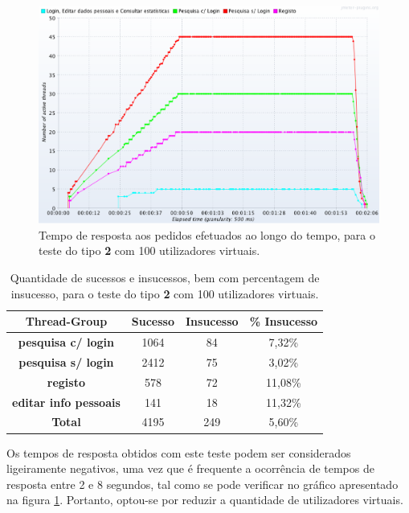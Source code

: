 \begin{figure}[H]
    \centering
    \includegraphics[width=1\textwidth]{images/Testes/4PC_RU100T.png}
    \caption{Tempo de resposta aos pedidos efetuados ao longo do tempo, para o teste do tipo \textbf{2} com 100 utilizadores virtuais.}
    \label{fig:4PC_RU_100_response}
\end{figure}

\begin{table}[H]
\centering
\caption{Quantidade de sucessos e insucessos, bem com percentagem de insucesso, para o teste do tipo \textbf{2} com 100 utilizadores virtuais.}
\begin{tabular}{cccc}
\hline
\rowcolor[HTML]{EFEFEF} 
\textbf{Thread-Group}                  & \textbf{Sucesso} & \textbf{Insucesso} & \textbf{\% Insucesso} \\ \hline
\textbf{pesquisa c/ login}             & 1064             & 84                 & 7,32\%                \\
\textbf{pesquisa s/ login}             & 2412             & 75                 & 3,02\%                \\
\textbf{registo}                       & 578              & 72                 & 11,08\%               \\
\textbf{editar info pessoais}          & 141              & 18                 & 11,32\%               \\ \hline
\cellcolor[HTML]{EFEFEF}\textbf{Total} & 4195             & 249                & 5,60\%                \\ \hline
\end{tabular}
\end{table}

Os tempos de resposta obtidos com este teste podem ser considerados ligeiramente negativos, uma vez que é frequente a ocorrência de tempos de resposta entre 2 e 8 segundos, tal como se pode verificar no gráfico apresentado na figura \ref{fig:4PC_RU_100_response}. Portanto, optou-se por reduzir a quantidade de utilizadores virtuais. 

